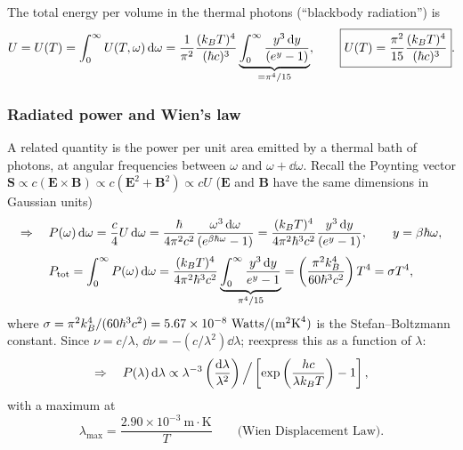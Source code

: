 The total energy per volume in the thermal photons (``blackbody radiation'') is
\begin{equation}
  U = U(T) = \int_0^\infty U(T,\omega)\mathop{}\!\mathrm{d}\omega = \frac{1}{\pi^2}\frac{(k_{B} T)^4}{(\hbar c)^3}\underbrace{\int_0^\infty\frac{y^3\mathop{}\!\mathrm{d} y}{(e^y-1)}}_{=\pi^4/15},
  \qquad\boxed{U(T) = \frac{\pi^2}{15}\frac{(k_{B} T)^4}{(\hbar c)^3}}.
\end{equation}

\subsubsection*{Radiated power and Wien's law}

A related quantity is the power per unit area emitted by a thermal bath of photons, at angular frequencies between $\omega$ and
$\omega+\dd\omega$. Recall the Poynting vector $\mathbf S\propto c(\mathbf E\times\mathbf B)\propto c(\mathbf E^2+\mathbf B^2)\propto cU$
($\mathbf E$ and $\mathbf B$ have the same dimensions in Gaussian units)
\begin{equation}
  \Rightarrow\quad P(\omega)\mathop{}\!\mathrm{d}\omega = \frac{c}{4}U\mathop{}\!\mathrm{d}\omega = \frac{\hbar}{4\pi^2c^2}\frac{\omega^3\mathop{}\!\mathrm{d}\omega}{(e^{\beta\hbar\omega}-1)}
  = \frac{(k_{B} T)^4}{4\pi^2\hbar^3c^2}\frac{y^3\mathop{}\!\mathrm{d} y}{(e^y-1)},\qquad y = \beta\hbar\omega,
\end{equation}
\begin{equation}
  P_{\text{tot}} = \int_0^\infty P(\omega)\mathop{}\!\mathrm{d}\omega = \frac{(k_{B} T)^4}{4\pi^2\hbar^3c^2}\underbrace{\int_0^\infty\frac{y^3\mathop{}\!\mathrm{d} y}{e^y-1}}_{\pi^4/15}
  = \left(\frac{\pi^2k_{B}^4}{60\hbar^3c^2}\right)T^4 = \sigma T^4,
\end{equation}
where $\sigma = \pi^2\kB^4/(60\hbar^3c^2) = 5.67\times 10^{-8}\ \text{Watts}/(\text{m}^2\text{K}^4)$ is the
Stefan--Boltzmann constant. Since $\nu = c/\lambda$, $\dd\nu = -(c/\lambda^2)\dd\lambda$; reexpress this as a function of
$\lambda$:
\begin{equation}
  \Rightarrow\quad P(\lambda)\mathop{}\!\mathrm{d}\lambda\propto\lambda^{-3}\left(\frac{\mathop{}\!\mathrm{d}\lambda}{\lambda^2}\right)\Big/\left[\exp\left(\frac{hc}{\lambda k_{B} T}\right)-1\right],
\end{equation}
with a maximum at
\begin{equation}
  \boxed{\lambda_{\max} = \frac{2.90\times 10^{-3}\ \text{m}\cdot\text{K}}{T}}\qquad\text{(Wien Displacement Law)}.
\end{equation}

